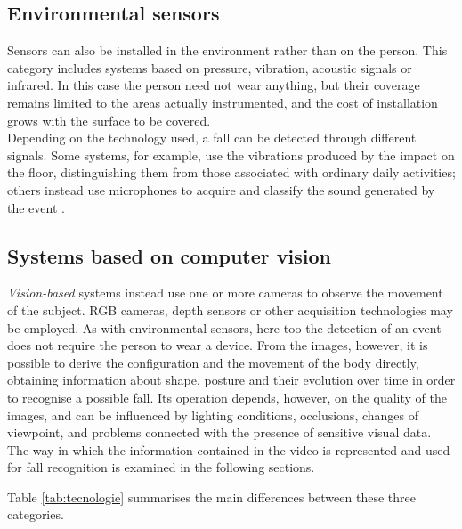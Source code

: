 \subsection{Environmental sensors}

Sensors can also be installed in the environment rather than on the person. This category includes systems based on pressure, vibration, acoustic signals or infrared.
In this case the person need not wear anything, but their coverage remains limited to the areas actually instrumented, and the cost of installation grows with the surface to be covered. \\
Depending on the technology used, a fall can be detected through different signals. Some systems, for example, use the vibrations produced
by the impact on the floor, distinguishing them from those associated with ordinary daily activities; others instead use microphones to acquire and classify the sound generated by the event \cite{MU}.

\subsection{Systems based on computer vision}

\emph{Vision-based} systems instead use one or more cameras to observe the movement of the subject. RGB cameras, depth sensors or other acquisition technologies may be employed.
As with environmental sensors, here too the detection of an event does not require the person to wear a device. From the images, however, it is possible to derive the configuration and the movement of the body directly, obtaining information about shape, posture and their evolution over time in order to recognise a possible fall.
Its operation depends, however, on the quality of the images, and can be influenced by lighting conditions, occlusions, changes of viewpoint, and problems connected with the presence of sensitive visual data.
The way in which the information contained in the video is represented and used for fall recognition is examined in the following sections.

Table \ref{tab:tecnologie} summarises the main differences between these three categories.

